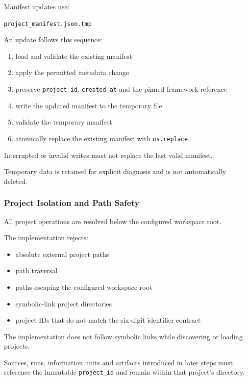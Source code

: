 Manifest updates use:

\texttt{project\_manifest.json.tmp}

An update follows this sequence:

\begin{enumerate}
\def\labelenumi{\arabic{enumi}.}
\tightlist
\item
  load and validate the existing manifest
\item
  apply the permitted metadata change
\item
  preserve \texttt{project\_id}, \texttt{created\_at} and the pinned framework reference
\item
  write the updated manifest to the temporary file
\item
  validate the temporary manifest
\item
  atomically replace the existing manifest with \texttt{os.replace}
\end{enumerate}

Interrupted or invalid writes must not replace the last valid manifest.

Temporary data is retained for explicit diagnosis and is not automatically deleted.

\hypertarget{project-isolation-and-path-safety}{%
\subsubsection{Project Isolation and Path Safety}\label{project-isolation-and-path-safety}}

All project operations are resolved below the configured workspace root.

The implementation rejects:

\begin{itemize}
\tightlist
\item
  absolute external project paths
\item
  path traversal
\item
  paths escaping the configured workspace root
\item
  symbolic-link project directories
\item
  project IDs that do not match the six-digit identifier contract
\end{itemize}

The implementation does not follow symbolic links while discovering or loading projects.

Sources, runs, information units and artifacts introduced in later steps must reference the immutable \texttt{project\_id} and remain within that project's directory.

